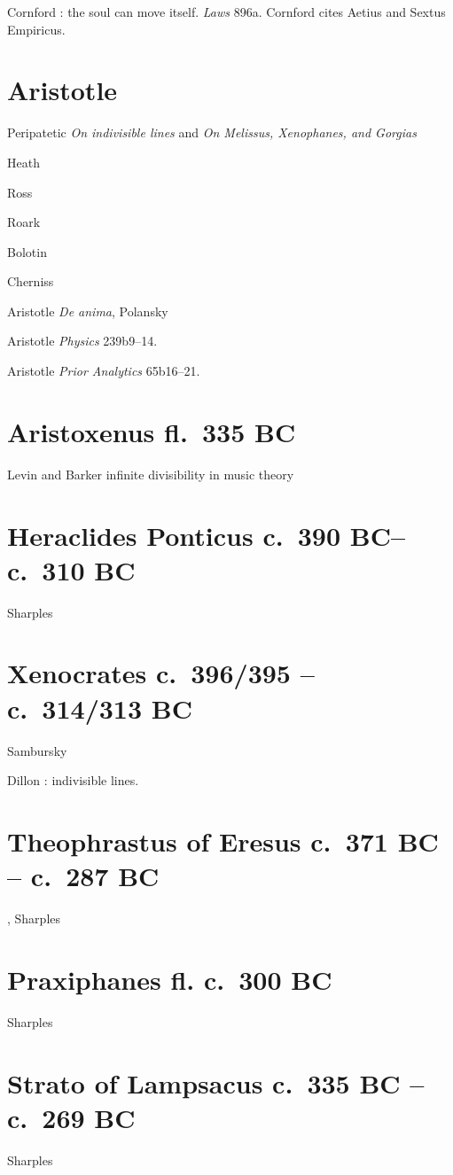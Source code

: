 \documentclass{amsart}
\theoremstyle{definition}
\begin{document}
Cornford \cite[p.~131]{religion}: the soul can move itself. {\em Laws} 896a. Cornford cites Aetius and Sextus Empiricus.


\section{Aristotle}
Peripatetic {\em On indivisible lines} and {\em On Melissus, Xenophanes, and Gorgias} \cite{hett}

Heath \cite{heatharistotle}

Ross \cite[p.~94]{ross}

Roark \cite{roark}

Bolotin \cite{bolotin}

Cherniss \cite{cherniss}

Aristotle {\em De anima}, Polansky \cite[p.~96]{polansky}

Aristotle {\em Physics} 239b9--14.

Aristotle {\em Prior Analytics} 65b16--21.

\section{Aristoxenus fl.~335 BC}
Levin \cite{levin} and Barker \cite{barker} infinite divisibility in music theory

\section{Heraclides Ponticus c.~390 BC--c.~310 BC}
Sharples \cite{heraclides}

\section{Xenocrates c.~396/395 -- c.~314/313 BC}
Sambursky \cite[p.~91]{sambursky}

Dillon \cite[pp.~111ff]{heirs}: indivisible lines.


\section{Theophrastus of Eresus c.~371 BC -- c.~287 BC},
Sharples \cite{theophrastus}


\section{Praxiphanes fl. c.~300 BC}
Sharples \cite{praxiphanes}

\section{Strato of Lampsacus c.~335 BC -- c.~269 BC}
Sharples \cite{strato}
\end{document}
